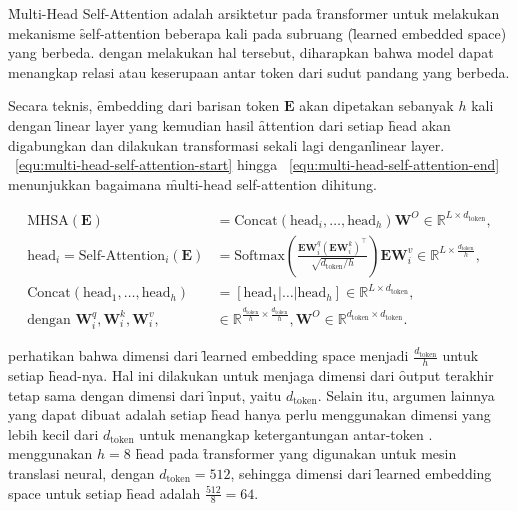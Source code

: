 	\f{Multi-Head Self-Attention} adalah arsiktetur pada \f{transformer} untuk melakukan mekanisme \f{self-attention} beberapa kali pada subruang (\f{learned embedded space}) yang berbeda. dengan melakukan hal tersebut, diharapkan bahwa model dapat menangkap relasi atau keserupaan antar token dari sudut pandang yang berbeda. 

	Secara teknis, \f{embedding} dari barisan token $\mathbf{E}$ akan dipetakan sebanyak $h$ kali dengan \f{linear layer} yang kemudian hasil \f{attention} dari setiap \f{head} akan digabungkan dan dilakukan transformasi sekali lagi dengan\f{linear layer}. \equ~\ref{equ:multi-head-self-attention-start} hingga \equ~\ref{equ:multi-head-self-attention-end} menunjukkan bagaimana \f{multi-head self-attention} dihitung.

	\begin{align}
		\label{equ:multi-head-self-attention-start}
		\text{MHSA}(\mathbf{E}) &= \text{Concat}(\text{head}_i, \dots, \text{head}_h)\mathbf{W}^O \in \mathbb{R}^{L \times d_{\text{token}}}, \\
		\text{head}_i = \text{Self-Attention}_i(\mathbf{E}) &= \text{Softmax}(\frac{\mathbf{E} \mathbf{W}^q_i (\mathbf{E} \mathbf{W}^k_i)^{\top}}{\sqrt{d_{\text{token}}/h}}) \mathbf{E} \mathbf{W}^v_i  \in  \mathbb{R}^{L \times \frac{d_{\text{token}}}{h}}, \\
		\text{Concat}(\text{head}_1, \dots, \text{head}_h) &= [\text{head}_1 | \dots | \text{head}_h] \in \mathbb{R}^{L \times d_{\text{token}}}, \\
		\label{equ:multi-head-self-attention-end}
		\text{dengan } \mathbf{W}^q_i, \mathbf{W}^k_i, \mathbf{W}^v_i,&\in \mathbb{R}^{\frac{d_{\text{token}}}{h} \times \frac{d_{\text{token}}}{h}}, \mathbf{W}^O \in \mathbb{R}^{d_{\text{token}} \times d_{\text{token}}}.
	\end{align}

	perhatikan bahwa dimensi dari \f{learned embedding space} menjadi $\frac{d_{\text{token}}}{h}$ untuk setiap \f{head}-nya. Hal ini dilakukan untuk menjaga dimensi dari \f{output} terakhir tetap sama dengan dimensi dari \f{input}, yaitu $d_{\text{token}}$. Selain itu, argumen lainnya yang dapat dibuat adalah setiap \f{head} hanya perlu menggunakan dimensi yang lebih kecil dari $d_{\text{token}}$ untuk menangkap ketergantungan antar-token \citep{pi-tau2023transformer}. \cite{transformerori} menggunakan $h=8$ \f{head} pada \f{transformer} yang digunakan untuk mesin translasi neural, dengan $d_{\text{token}} = 512$, sehingga dimensi dari \f{learned embedding space} untuk setiap \f{head} adalah $\frac{512}{8} = 64$.

